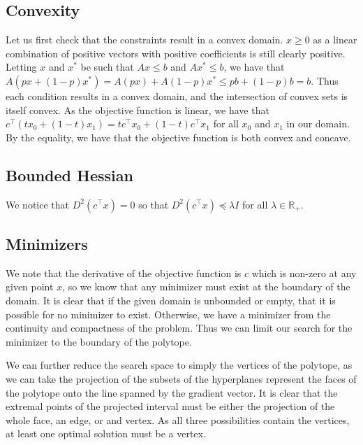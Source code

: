 \documentclass[letterpaper,twocolumn,12pt]{article}
\begin{document}
\subsection{Convexity}
Let us first check that the constraints result in a convex domain. $x\geq 0$ as a
linear combination of positive vectors with positive coefficients is still clearly
positive. Letting $x$ and $x^*$ be such that $Ax\leq b$ and $Ax^*\leq b$, we have
that $A(px+(1-p)x^*)=A(px)+A(1-p)x^*\leq pb+(1-p)b=b$. Thus each condition results
in a convex domain, and the intersection of convex sets is itself convex.
As the objective function is linear, we have that
$c^\intercal (tx_0+(1-t)x_1)=tc^\intercal x_0+(1-t)c^\intercal x_1$ for all
$x_0$ and $x_1$ in our domain. By the equality, we have that the objective function
is both convex and concave.

\subsection{Bounded Hessian}
We notice that $D^2(c^\intercal x)=0$ so that $D^2(c^\intercal x)\preceq\lambda I$
for all $\lambda\in\mathbb{R}_+$.

\subsection{Minimizers}
We note that the derivative of the objective function is $c$ which is non-zero at
any given point $x$,
so we know that any minimizer must exist at the boundary of the domain. It is clear
that if the given domain is unbounded or empty, that it is possible for no minimizer
to exist. Otherwise, we have a minimizer from the continuity and compactness of the
problem. Thus we can limit our search for the minimizer to the boundary of the polytope.

We can further reduce the search space to simply the vertices of the polytope, as
we can take the projection of the subsets of the hyperplanes represent the faces of the
polytope onto the line spanned by the gradient vector. It is clear that the extremal
points of the projected interval must be either the projection of the whole face,
an edge, or and vertex. As all three possibilities contain the vertices, at least one
optimal solution must be a vertex.
\end{document}

